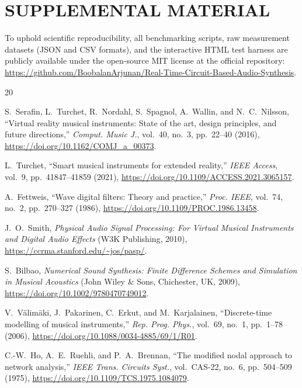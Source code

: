 \documentclass[fleqn,final]{jaes}
\begin{document}
\section{SUPPLEMENTAL MATERIAL}
To uphold scientific reproducibility, all benchmarking scripts, raw measurement datasets (JSON and CSV formats), and the interactive HTML test harness are publicly available under the open-source MIT license at the official repository: \url{https://github.com/BoobalanArjunan/Real-Time-Circuit-Based-Audio-Synthesis}.

\begin{thebibliography}{20}
\small
\setlength{\itemsep}{0.5pt plus 0.5pt minus 0.5pt}
\setlength{\parsep}{0pt}
\setlength{\parskip}{0pt}

S.~Serafin, L.~Turchet, R.~Nordahl, S.~Spagnol, A.~Wallin, and N.~C.~Nilsson,
``Virtual reality musical instruments: State of the art, design principles, and future directions,''
\textit{Comput. Music J.}, vol.~40, no.~3, pp.~22--40 (2016),
\url{https://doi.org/10.1162/COMJ_a_00373}.

L.~Turchet,
``Smart musical instruments for extended reality,''
\textit{IEEE Access}, vol.~9, pp.~41847--41859 (2021),
\url{https://doi.org/10.1109/ACCESS.2021.3065157}.

A.~Fettweis,
``Wave digital filters: Theory and practice,''
\textit{Proc. IEEE}, vol.~74, no.~2, pp.~270--327 (1986),
\url{https://doi.org/10.1109/PROC.1986.13458}.

J.~O.~Smith,
\textit{Physical Audio Signal Processing: For Virtual Musical Instruments and Digital Audio Effects}
(W3K Publishing, 2010),
\url{https://ccrma.stanford.edu/~jos/pasp/}.

S.~Bilbao,
\textit{Numerical Sound Synthesis: Finite Difference Schemes and Simulation in Musical Acoustics}
(John Wiley \& Sons, Chichester, UK, 2009),
\url{https://doi.org/10.1002/9780470749012}.

V.~V{\"a}lim{\"a}ki, J.~Pakarinen, C.~Erkut, and M.~Karjalainen,
``Discrete-time modelling of musical instruments,''
\textit{Rep. Prog. Phys.}, vol.~69, no.~1, pp.~1--78 (2006),
\url{https://doi.org/10.1088/0034-4885/69/1/R01}.

C.-W.~Ho, A.~E.~Ruehli, and P.~A.~Brennan,
``The modified nodal approach to network analysis,''
\textit{IEEE Trans. Circuits Syst.}, vol.~CAS-22, no.~6, pp.~504--509 (1975),
\url{https://doi.org/10.1109/TCS.1975.1084079}.


\end{thebibliography}
\end{document}
